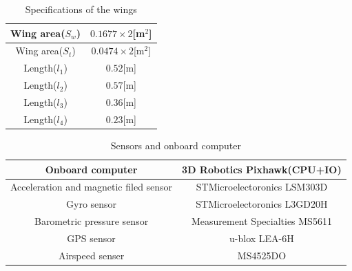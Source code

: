 \begin{table}[h]
	\begin{center}
		\caption{Specifications of the wings}
		\label{wingspec}
		\begin{tabular}{|c|c|}\hline
			Wing area($S_w$) & $0.1677\times2$[m$^2$]\\ \hline
			Wing area($S_t$) & $0.0474\times2$[m$^2$]\\ \hline
			Length($l_1$) & $0.52$[m]\\ \hline
			Length($l_2$) & $0.57$[m]\\ \hline
			Length($l_3$) & $0.36$[m]\\ \hline
			Length($l_4$) & $0.23$[m]\\ \hline
		\end{tabular}
	\end{center}
\end{table}
\begin{table}[h]
	\begin{center}
		\caption{Sensors and onboard computer}
		\label{tab:Tab2.2}
		\begin{tabular}{|c|c|} \hline
			Onboard computer & 3D Robotics Pixhawk(CPU+IO)\\ \hline
			Acceleration and magnetic filed sensor & STMicroelectoronics LSM303D\\ \hline
			Gyro sensor & STMicroelectoronics L3GD20H\\ \hline
			Barometric pressure sensor & Measurement Specialties MS5611\\ \hline
			GPS sensor & u-blox LEA-6H\\ \hline
			Airspeed senser & MS4525DO\\ \hline
		\end{tabular}
	\end{center}
\end{table}
